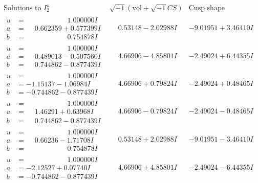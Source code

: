 \documentclass[1p]{elsarticle_modified}
\theoremstyle{definition}
\newcommand{\I}{\sqrt{-1}}
\begin{document}
$$\begin{array}{c|c|c}  
\text{Solutions to }I^u_{2}& \I (\text{vol} + \sqrt{-1}CS) & \text{Cusp shape}\\
 \hline 
\begin{aligned}
u &= \phantom{-0.000000 -}1.000000 I \\
a &= \phantom{-}0.662359 + 0.577399 I \\
b &= \phantom{-0.000000 -}0.754878 I\end{aligned}
 & \phantom{-}0.53148 - 2.02988 I & -9.01951 + 3.46410 I \\ \hline\begin{aligned}
u &= \phantom{-0.000000 -}1.000000 I \\
a &= \phantom{-}0.489013 - 0.507560 I \\
b &= \phantom{-}0.744862 - 0.877439 I\end{aligned}
 & \phantom{-}4.66906 - 4.85801 I & -2.49024 + 6.44355 I \\ \hline\begin{aligned}
u &= \phantom{-0.000000 -}1.000000 I \\
a &= -1.15137 - 1.06984 I \\
b &= -0.744862 - 0.877439 I\end{aligned}
 & \phantom{-}4.66906 + 0.79824 I & -2.49024 + 0.48465 I \\ \hline\begin{aligned}
u &= \phantom{-0.000000 -}1.000000 I \\
a &= \phantom{-}1.46291 + 0.63968 I \\
b &= \phantom{-}0.744862 - 0.877439 I\end{aligned}
 & \phantom{-}4.66906 - 0.79824 I & -2.49024 - 0.48465 I \\ \hline\begin{aligned}
u &= \phantom{-0.000000 -}1.000000 I \\
a &= \phantom{-}0.66236 - 1.71708 I \\
b &= \phantom{-0.000000 -}0.754878 I\end{aligned}
 & \phantom{-}0.53148 + 2.02988 I & -9.01951 - 3.46410 I \\ \hline\begin{aligned}
u &= \phantom{-0.000000 -}1.000000 I \\
a &= -2.12527 + 0.07740 I \\
b &= -0.744862 - 0.877439 I\end{aligned}
 & \phantom{-}4.66906 + 4.85801 I & -2.49024 - 6.44355 I \\ \hline\begin{aligned}

\end{aligned}
\end{array}$$
\end{document}
